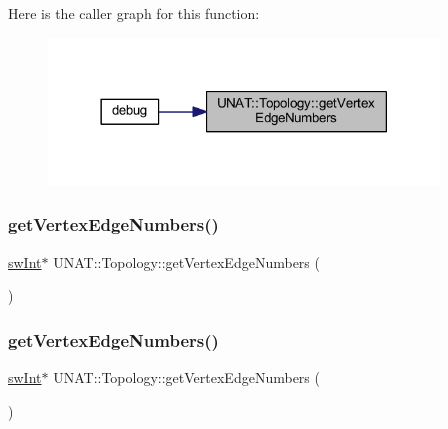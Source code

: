 Here is the caller graph for this function\+:
\nopagebreak
\begin{figure}[H]
\begin{center}
\leavevmode
\includegraphics[width=294pt]{classUNAT_1_1Topology_a5b25e62c756c7c70658e92f8ef87d133_icgraph}
\end{center}
\end{figure}
\mbox{\label{classUNAT_1_1Topology_a6838e39b330fa60923fb44e7f47a468d}} 
\subsubsection{\texorpdfstring{getVertexEdgeNumbers()}{getVertexEdgeNumbers()}\hspace{0.1cm}{\footnotesize\ttfamily [2/3]}}
{\footnotesize\ttfamily \mbox{\hyperlink{include_2swMacro_8h_a113cf5f6b5377cdf3fac6aa4e443e9aa}{sw\+Int}}$\ast$ U\+N\+A\+T\+::\+Topology\+::get\+Vertex\+Edge\+Numbers (\begin{DoxyParamCaption}{ }\end{DoxyParamCaption})}

\mbox{\label{classUNAT_1_1Topology_a6838e39b330fa60923fb44e7f47a468d}} 
\subsubsection{\texorpdfstring{getVertexEdgeNumbers()}{getVertexEdgeNumbers()}\hspace{0.1cm}{\footnotesize\ttfamily [3/3]}}
{\footnotesize\ttfamily \mbox{\hyperlink{include_2swMacro_8h_a113cf5f6b5377cdf3fac6aa4e443e9aa}{sw\+Int}}$\ast$ U\+N\+A\+T\+::\+Topology\+::get\+Vertex\+Edge\+Numbers (\begin{DoxyParamCaption}{ }\end{DoxyParamCaption})}

